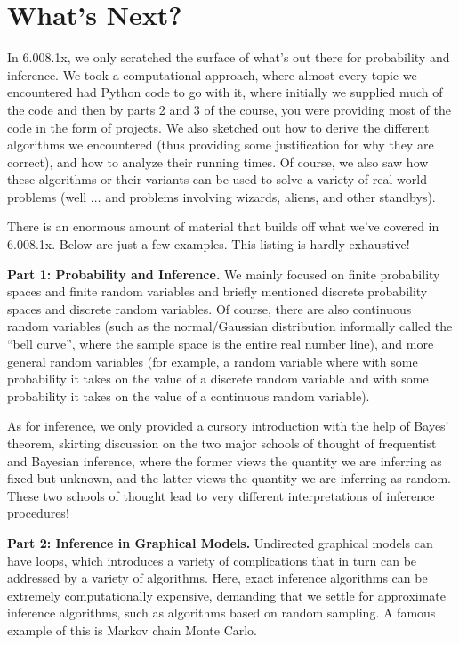 

\section{What's Next?}

In 6.008.1x, we only scratched the surface of what's out there for probability and inference. We took a computational approach, where almost every topic we encountered had Python code to go with it, where initially we supplied much of the code and then by parts 2 and 3 of the course, you were providing most of the code in the form of projects. We also sketched out how to derive the different algorithms we encountered (thus providing some justification for why they are correct), and how to analyze their running times. Of course, we also saw how these algorithms or their variants can be used to solve a variety of real-world problems (well $\dots$ and problems involving wizards, aliens, and other standbys).

There is an enormous amount of material that builds off what we've covered in 6.008.1x. Below are just a few examples. This listing is hardly exhaustive!

\textbf{Part 1: Probability and Inference.} We mainly focused on finite probability spaces and finite random variables and briefly mentioned discrete probability spaces and discrete random variables. Of course, there are also continuous random variables (such as the normal/Gaussian distribution informally called the ``bell curve'', where the sample space is the entire real number line), and more general random variables (for example, a random variable where with some probability it takes on the value of a discrete random variable and with some probability it takes on the value of a continuous random variable).

As for inference, we only provided a cursory introduction with the help of Bayes' theorem, skirting discussion on the two major schools of thought of frequentist and Bayesian inference, where the former views the quantity we are inferring as fixed but unknown, and the latter views the quantity we are inferring as random. These two schools of thought lead to very different interpretations of inference procedures!

\textbf{Part 2: Inference in Graphical Models.} Undirected graphical models can have loops, which introduces a variety of complications that in turn can be addressed by a variety of algorithms. Here, exact inference algorithms can be extremely computationally expensive, demanding that we settle for approximate inference algorithms, such as algorithms based on random sampling. A famous example of this is Markov chain Monte Carlo.

